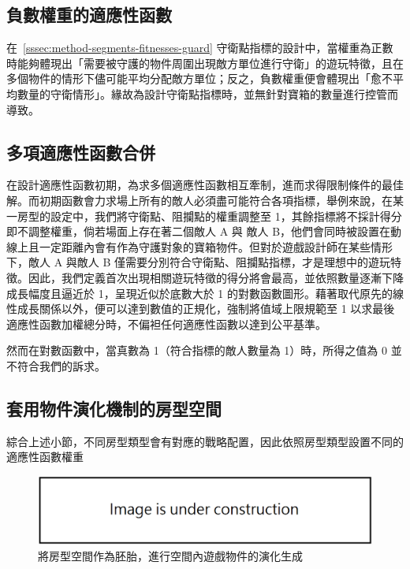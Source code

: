 \subsection{負數權重的適應性函數}
\label{ssec:method-segments-minusscores}

在~\ref{sssec:method-segments-fitnesses-guard} 守衛點指標的設計中，當權重為正數時能夠體現出「需要被守護的物件周圍出現敵方單位進行守衛」的遊玩特徵，且在多個物件的情形下儘可能平均分配敵方單位；反之，負數權重便會體現出「愈不平均數量的守衛情形」。緣故為設計守衛點指標時，並無針對寶箱的數量進行控管而導致。

\subsection{多項適應性函數合併}
\label{ssec:method-segments-multiobjectives}

在設計適應性函數初期，為求多個適應性函數相互牽制，進而求得限制條件的最佳解。而初期函數會力求場上所有的敵人必須盡可能符合各項指標，舉例來說，在某一房型的設定中，我們將守衛點、阻攔點的權重調整至 1，其餘指標將不採計得分即不調整權重，倘若場面上存在著二個敵人 A 與 敵人 B，他們會同時被設置在動線上且一定距離內會有作為守護對象的寶箱物件。但對於遊戲設計師在某些情形下，敵人 A 與敵人 B 僅需要分別符合守衛點、阻攔點指標，才是理想中的遊玩特徵。因此，我們定義首次出現相關遊玩特徵的得分將會最高，並依照數量逐漸下降成長幅度且逼近於 1，呈現近似於底數大於 1 的對數函數圖形。藉著取代原先的線性成長關係以外，便可以達到數值的正規化，強制將值域上限規範至 1 以求最後適應性函數加權總分時，不偏袒任何適應性函數以達到公平基準。

然而在對數函數中，當真數為 1（符合指標的敵人數量為 1）時，所得之值為 0 並不符合我們的訴求。

\subsection{套用物件演化機制的房型空間}
\label{ssec:method-segments-appliedonvolumes}

綜合上述小節，不同房型類型會有對應的戰略配置，因此依照房型類型設置不同的適應性函數權重

\begin{figure}[ht]
  \begin{center}
    \includegraphics[width=1.0\textwidth]{figures/under_construction.png}
    \caption{將房型空間作為胚胎，進行空間內遊戲物件的演化生成} 
    \label{fig:applied-ga-on-volume}
  \end{center}
\end{figure}



